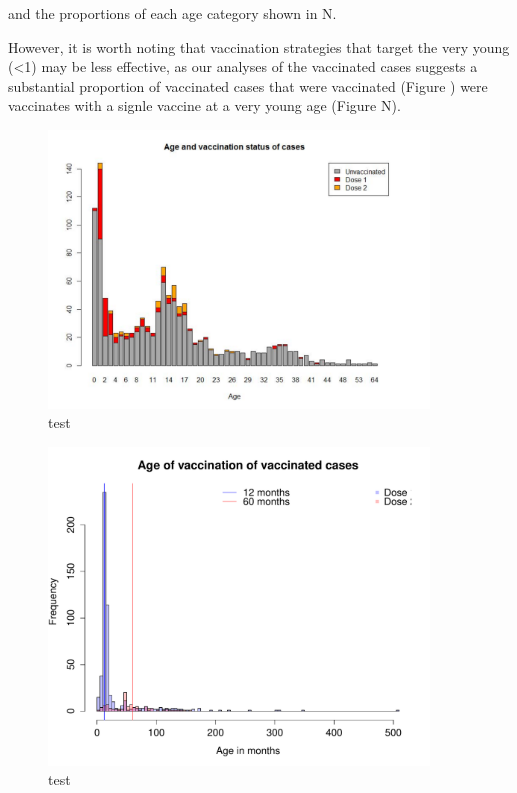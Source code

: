 \documentclass{article}
\begin{document}
\normalsize
and the proportions of each age category shown in N.

However, it is worth noting that vaccination strategies that target the very young (<1) may be less effective, as our analyses of the vaccinated cases suggests a substantial proportion of vaccinated cases that were vaccinated (Figure ) were vaccinates with a signle vaccine at a very young age (Figure N).

\begin{figure}
     \centering
     \includegraphics[width=0.9\textwidth]{vaccinationstatusage.pdf}
     \caption{test}
     \label{fig:vaccstat}
\end{figure}

\begin{figure}
     \centering
     \includegraphics[width=0.9\textwidth]{AgeOfVaccinationVaccinated.pdf}
     \caption{test}
     \label{fig:ageofvacc}
\end{figure}
\end{document}
